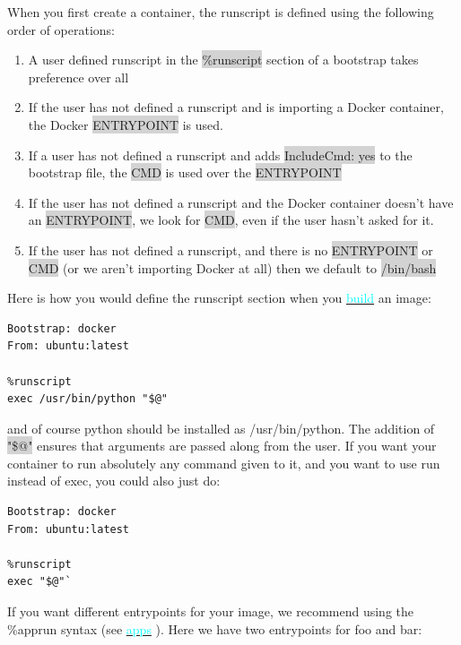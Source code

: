 \documentclass[a4paper]{article}
\newcounter{subsubsubsection}[subsubsection]
\begin{document}
	When you first create a container, the runscript is defined using the following order of operations:
	
	\begin{enumerate}
	\item A user defined runscript in the \colorbox{lightgray}{\%runscript} section of a bootstrap takes preference over all
	\item If the user has not defined a runscript and is importing a Docker container, the Docker \colorbox{lightgray}{ENTRYPOINT} is used.
	\item If a user has not defined a runscript and adds \colorbox{lightgray}{IncludeCmd: yes} to the bootstrap file, the \colorbox{lightgray}{CMD} is used over the \colorbox{lightgray}{ENTRYPOINT}
	\item If the user has not defined a runscript and the Docker container doesn’t have an \colorbox{lightgray}{ENTRYPOINT}, we look for \colorbox{lightgray}{CMD}, even if the user hasn’t asked for it.
	\item If the user has not defined a runscript, and there is no \colorbox{lightgray}{ENTRYPOINT} or \colorbox{lightgray}{CMD} (or we aren’t importing Docker at all) then we default to \colorbox{lightgray}{/bin/bash}
	\end{enumerate}
	
	Here is how you would define the runscript section when you \hyperref[sec:buildcontainer]{{\textcolor{cyan}{build}}} an image:
	
\begin{lstlisting}[frame=single]
Bootstrap: docker
From: ubuntu:latest

%runscript
exec /usr/bin/python "$@"
\end{lstlisting}
and of course python should be installed as /usr/bin/python. The addition of \colorbox{lightgray}{"\$@"} ensures that arguments are passed along from the user. If you want your container to run absolutely any command given to it, and you want to use run instead of exec, you could also just do:

\begin{lstlisting}[frame=single]
Bootstrap: docker
From: ubuntu:latest

%runscript
exec "$@"`
\end{lstlisting}

If you want different entrypoints for your image, we recommend using the \%apprun syntax (see \hyperref[sec:scifapps]{{\textcolor{cyan}{apps}}} ). Here we have two entrypoints for foo and bar:
\end{document}
